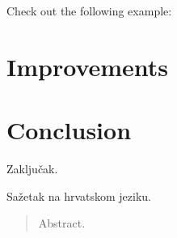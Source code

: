 \documentclass[times, utf8, diplomski]{fer}
\theoremstyle{definition}
\begin{document}
Check out the following example:



\chapter{Improvements}










\chapter{Conclusion}
Zaključak.




\begin{sazetak}
Sažetak na hrvatskom jeziku.

\end{sazetak}

\begin{abstract}
Abstract.

\end{abstract}
\end{document}
